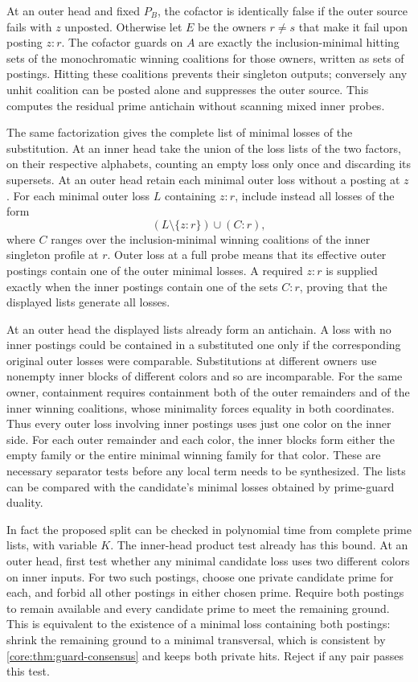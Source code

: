 At an outer head and fixed $P_B$, the cofactor is identically
false if the outer source fails with $z$ unposted. Otherwise let
$E$ be the owners $r\ne s$ that make it fail upon posting $z:r$.
The cofactor guards on $A$ are exactly the inclusion-minimal
hitting sets of the monochromatic winning coalitions for those
owners, written as sets of postings. Hitting these coalitions
prevents their singleton outputs; conversely any unhit coalition
can be posted alone and suppresses the outer source. This computes
the residual prime antichain without scanning mixed inner probes.

The same factorization gives the complete list of minimal losses
of the substitution. At an inner head take the union of the loss
lists of the two factors, on their respective alphabets, counting
an empty loss only once and discarding its supersets. At an outer
head retain each minimal outer loss without a posting at $z$. For
each minimal outer loss $L$ containing $z:r$, include instead
all losses of the form
\[
  (L\setminus\{z:r\})\cup(C:r),
\]
where $C$ ranges over the inclusion-minimal winning coalitions
of the inner singleton profile at $r$. Outer loss at a full probe
means that its effective outer postings contain one of the outer
minimal losses. A required $z:r$ is supplied exactly when the
inner postings contain one of the sets $C:r$, proving that the
displayed lists generate all losses.

At an outer head the displayed lists already form an antichain.
A loss with no inner postings could be contained in a substituted
one only if the corresponding original outer losses were comparable.
Substitutions at different owners use nonempty inner blocks of
different colors and so are incomparable. For the same owner,
containment requires containment both of the outer remainders
and of the inner winning coalitions, whose minimality forces
equality in both coordinates. Thus every outer loss involving
inner postings uses just one color on the inner side. For each
outer remainder and each color, the inner blocks form either the
empty family or the entire minimal winning family for that color.
These are necessary separator tests before any local term needs
to be synthesized. The lists can be compared with the candidate's
minimal losses obtained by prime-guard duality.

In fact the proposed split can be checked in polynomial time from
complete prime lists, with variable $K$. The inner-head product
test already has this bound. At an outer head, first test whether
any minimal candidate loss uses two different colors on inner
inputs. For two such postings, choose one private candidate prime
for each, and forbid all other postings in either chosen prime.
Require both postings to remain available and every candidate
prime to meet the remaining ground. This is equivalent to the
existence of a minimal loss containing both postings: shrink the
remaining ground to a minimal transversal, which is consistent
by \cref{core:thm:guard-consensus} and keeps both private hits.
Reject if any pair passes this test.

